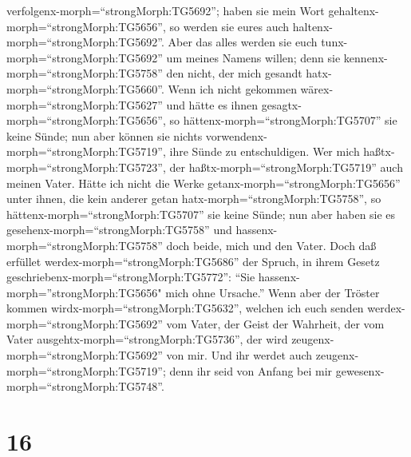 verfolgenx-morph=``strongMorph:TG5692''; haben sie mein Wort
gehaltenx-morph=``strongMorph:TG5656'', so werden sie eures auch
haltenx-morph=``strongMorph:TG5692''.  Aber das alles
werden sie euch tunx-morph=``strongMorph:TG5692'' um meines Namens
willen; denn sie kennenx-morph=``strongMorph:TG5758'' den nicht, der
mich gesandt hatx-morph=``strongMorph:TG5660''.  Wenn ich
nicht gekommen wärex-morph=``strongMorph:TG5627'' und hätte es ihnen
gesagtx-morph=``strongMorph:TG5656'', so
hättenx-morph=``strongMorph:TG5707'' sie keine Sünde; nun aber können
sie nichts vorwendenx-morph=``strongMorph:TG5719'', ihre Sünde zu
entschuldigen.  Wer mich
haßtx-morph=``strongMorph:TG5723'', der
haßtx-morph=``strongMorph:TG5719'' auch meinen Vater. 
Hätte ich nicht die Werke getanx-morph=``strongMorph:TG5656'' unter
ihnen, die kein anderer getan hatx-morph=``strongMorph:TG5758'', so
hättenx-morph=``strongMorph:TG5707'' sie keine Sünde; nun aber haben sie
es gesehenx-morph=``strongMorph:TG5758'' und
hassenx-morph=``strongMorph:TG5758'' doch beide, mich und den Vater.
 Doch daß erfüllet werdex-morph=``strongMorph:TG5686'' der
Spruch, in ihrem Gesetz geschriebenx-morph=``strongMorph:TG5772'': ``Sie
hassenx-morph=''strongMorph:TG5656" mich ohne Ursache.'' 
Wenn aber der Tröster kommen wirdx-morph=``strongMorph:TG5632'', welchen
ich euch senden werdex-morph=``strongMorph:TG5692'' vom Vater, der Geist
der Wahrheit, der vom Vater ausgehtx-morph=``strongMorph:TG5736'', der
wird zeugenx-morph=``strongMorph:TG5692'' von mir.  Und ihr
werdet auch zeugenx-morph=``strongMorph:TG5719''; denn ihr seid von
Anfang bei mir gewesenx-morph=``strongMorph:TG5748''.

\hypertarget{section-15}{%
\section{16}\label{section-15}}

